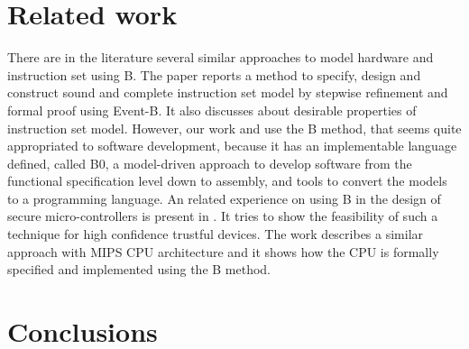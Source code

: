 \documentclass[a4paper]{llncs}
\begin{document}
 

\section{Related work}
\label{sec:relatedworks}

There are in the literature several similar approaches to model hardware and instruction set using B.
The paper \cite{springerlink:Yuan2011} reports a method to specify, design and construct sound and complete instruction set model by stepwise refinement and formal proof using Event-B. It also discusses about desirable properties of instruction set model. However, our work \cite{Valerio_SBMF09} and \cite{Subotic2010} use the B method, that seems quite appropriated to software development, because it has 
an implementable language defined, called B0, a model-driven approach \cite{Dantas_SBMF08} to develop software from the functional specification level down to assembly, and tools to convert the models to a programming language. An related experience on using B in the design of secure micro-controllers is present in \cite{Marc20113}. It tries to show the feasibility of such a technique for high confidence trustful devices. The work \cite{Subotic2010} describes a similar approach with MIPS CPU architecture and it shows how the CPU is formally specified and implemented using the B method.


% 
%
%
%

 
\section{Conclusions}
\label{sec:conclusions} 
\end{document}
